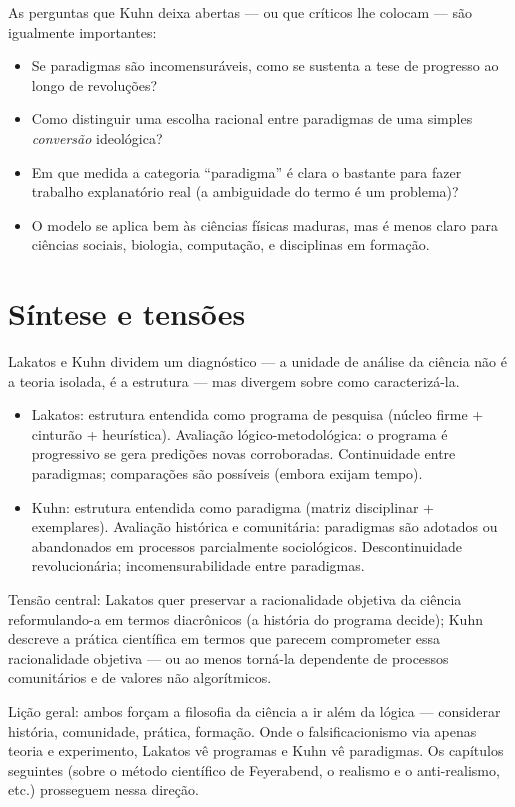\documentclass[9pt,a4paper]{extarticle}
\newcommand{\impt}[1]{\textcolor{important}{#1}}
\newcommand{\ntc}[1]{\textcolor{notice}{#1}}
\theoremstyle{definition}
\begin{document}
As perguntas que Kuhn deixa abertas --- ou que críticos lhe colocam --- são igualmente importantes:

\begin{itemize}
  \item Se paradigmas são incomensuráveis, como se sustenta a tese de \impt{progresso} ao longo de revoluções?
  \item Como distinguir uma escolha racional entre paradigmas de uma simples \emph{conversão} ideológica?
  \item Em que medida a categoria ``paradigma'' é clara o bastante para fazer trabalho explanatório real (a ambiguidade do termo é um problema)?
  \item O modelo se aplica bem às ciências físicas maduras, mas é menos claro para ciências sociais, biologia, computação, e disciplinas em formação.
\end{itemize}

\section{Síntese e tensões}

Lakatos e Kuhn dividem um diagnóstico --- \impt{a unidade de análise da ciência não é a teoria isolada, é a estrutura} --- mas divergem sobre como caracterizá-la.

\begin{itemize}
  \item \ntc{Lakatos:} estrutura entendida como \impt{programa de pesquisa} (núcleo firme + cinturão + heurística). Avaliação \impt{lógico-metodológica}: o programa é progressivo se gera predições novas corroboradas. Continuidade entre paradigmas; comparações são possíveis (embora exijam tempo).
  \item \ntc{Kuhn:} estrutura entendida como \impt{paradigma} (matriz disciplinar + exemplares). Avaliação \impt{histórica e comunitária}: paradigmas são adotados ou abandonados em processos parcialmente sociológicos. Descontinuidade revolucionária; incomensurabilidade entre paradigmas.
\end{itemize}

\impt{Tensão central:} Lakatos quer preservar a racionalidade objetiva da ciência reformulando-a em termos diacrônicos (a história do programa decide); Kuhn descreve a prática científica em termos que parecem comprometer essa racionalidade objetiva --- ou ao menos torná-la dependente de processos comunitários e de valores não algorítmicos.

\ntc{Lição geral:} ambos forçam a filosofia da ciência a ir \impt{além da lógica} --- considerar história, comunidade, prática, formação. Onde o falsificacionismo via apenas teoria e experimento, Lakatos vê programas e Kuhn vê paradigmas. Os capítulos seguintes (sobre o método científico de Feyerabend, o realismo e o anti-realismo, etc.) prosseguem nessa direção.
\end{document}
